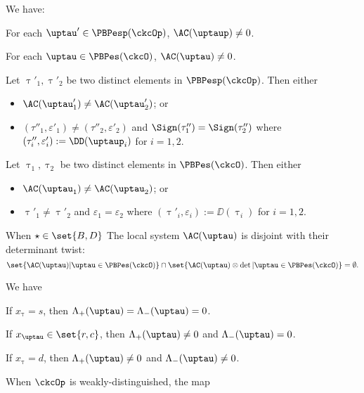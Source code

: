 \documentclass[ssunip]{subfiles}
\begin{document}
\begin{prop}\label{prop:LLS}
   We have:
  \begin{enumS}
    \item For each $\uptau'\in \PBPesp(\ckcOp)$, $\oAC{\uptaup}\neq 0$.
    \item For each $\uptau\in \PBPes(\ckcO)$, $\oAC{\uptau}\neq 0$.
    \item Let $\uptau'_{1},\uptau'_{2}$ be two distinct elements in
    $\PBPesp(\ckcOp)$. Then either
    \begin{itemize}
      \item      $\oAC{\uptau'_{1}}\neq \oAC{\uptau'_{2}}$; or
      \item $(\tau''_{1},\varepsilon'_{1})\neq (\tau''_{2},\varepsilon'_{2})$
      and $\Sign(\tau''_{1})=\Sign(\tau''_{2})$ where
      $(\tau''_{i},\varepsilon'_{i}) := \DD(\uptaup_{i})$ for $i=1,2$.
  \end{itemize}
  \item Let $\uptau_{1},\uptau_{2}$ be two distinct elements in
    $\PBPes(\ckcO)$. Then either
    \begin{itemize}
      \item $\oAC{\uptau_{1}}\neq \oAC{\uptau_{2}}$; or
      \item $\uptau'_{1}\neq \uptau'_{2}$ and $\varepsilon_{1} = \varepsilon_{2}$
       where $(\uptau'_{i},\varepsilon_{i}) := \DD(\uptau_{i})$ for $i=1,2$.
  \end{itemize}
    \item \label{p:drcls.1}
    When $\star \in \set{B,D}$
    The local system $\oAC{\uptau}$ is disjoint with their determinant twist:
    \begin{equation}\label{eq:LS.dis}
      \set{\oAC{\uptau} | \uptau \in \PBPes(\ckcO)} \cap
      \set{\oAC{\uptau}\otimes \det| \uptau\in \PBPes(\ckcO)} = \emptyset.
    \end{equation}
  \item \label{it:LLS.4}
  We have
  \begin{enumT}
    \item If $x_{\uptau} = s$, then $\pAC{\uptau} = \nAC{\uptau} = 0$.
    \item If $x_{\uptau} \in \set{r,c}$, then $\pAC{\uptau} \neq 0$ and $\nAC{\uptau}=0$.
    \item If $x_{\uptau} = d$, then $\pAC{\uptau}\neq 0$ and $\nAC{\uptau}\neq 0$.
  \end{enumT}
  \item When $\ckcOp$ is weakly-distinguished, the map

\end{enumS}
\end{prop}
\end{document}
